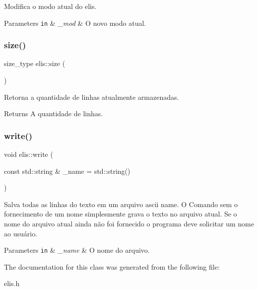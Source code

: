 Modifica o modo atual do elis. 


\begin{DoxyParams}[1]{Parameters}
\mbox{\tt in}  & {\em \+\_\+mod} & O novo modo atual. \\
\hline
\end{DoxyParams}
\mbox{\label{classelis_ab869080dfc9c83c577e4550eed1f17c1}} 
\subsubsection{\texorpdfstring{size()}{size()}}
{\footnotesize\ttfamily size\+\_\+type elis\+::size (\begin{DoxyParamCaption}{ }\end{DoxyParamCaption})\hspace{0.3cm}{\ttfamily [inline]}}



Retorna a quantidade de linhas atualmente armazenadas. 

\begin{DoxyReturn}{Returns}
A quantidade de linhas. 
\end{DoxyReturn}
\mbox{\label{classelis_a92ba8d201559a28f3592ab340311e108}} 
\subsubsection{\texorpdfstring{write()}{write()}}
{\footnotesize\ttfamily void elis\+::write (\begin{DoxyParamCaption}\item[{const std\+::string \&}]{\+\_\+name = {\ttfamily std\+:\+:string()} }\end{DoxyParamCaption})}



Salva todas as linhas do texto em um arquivo ascii name. O Comando sem o fornecimento de um nome simplesmente grava o texto no arquivo atual. Se o nome do arquivo atual ainda não foi fornecido o programa deve solicitar um nome ao usuário. 


\begin{DoxyParams}[1]{Parameters}
\mbox{\tt in}  & {\em \+\_\+name} & O nome do arquivo. \\
\hline
\end{DoxyParams}


The documentation for this class was generated from the following file\+:\begin{DoxyCompactItemize}
\item 
elis.\+h\end{DoxyCompactItemize}
